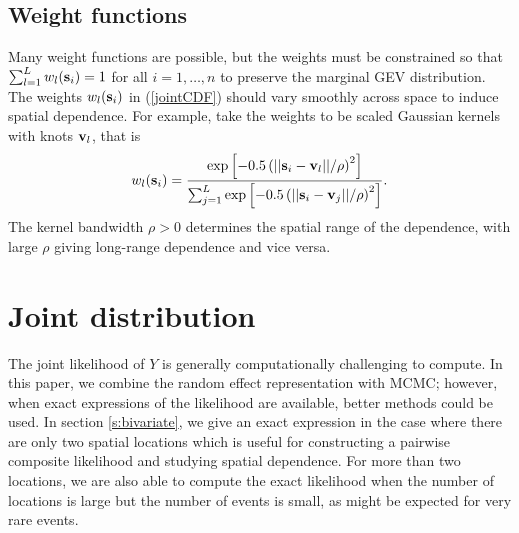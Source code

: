 \documentclass[11pt]{article}
\begin{document}
\subsection{Weight functions}\label{s:weights}
Many weight functions are possible, but the weights must be constrained so that $\sum_{l=1}^L w_{l}(\mbox{\bf s}_i)=1$ for all $i=1,\ldots,n$ to preserve the marginal GEV distribution.
The weights $w_{l}(\mbox{\bf s}_i)$ in (\ref{jointCDF}) should vary smoothly across space to induce spatial dependence.
For example, \cite{Reich2012} take the weights to be scaled Gaussian kernels with knots $\mbox{\bf v}_l$, that is
\begin{align}\label{w}
   w_{l}(\mbox{\bf s}_i) = \frac{\exp\left[-0.5\left(||\mbox{\bf s}_i-\mbox{\bf v}_l||/\rho\right)^2\right]}
                 {\sum_{j=1}^L\exp\left[-0.5\left(||\mbox{\bf s}_i-\mbox{\bf v}_j||/\rho\right)^2\right]}.
\end{align}
The kernel bandwidth $\rho>0$ determines the spatial range of the dependence, with large $\rho$ giving long-range dependence and vice versa.

\section{Joint distribution}\label{s:multivariate}
The joint likelihood of $Y$ is generally computationally challenging to compute.
In this paper, we combine the random effect representation with MCMC; however, when exact expressions of the likelihood are available, better methods could be used.
In section \ref{s:bivariate}, we give an exact expression in the case where there are only two spatial locations which is useful for constructing a pairwise composite likelihood and studying spatial dependence.
For more than two locations, we are also able to compute the exact likelihood when the number of locations is large but the number of events is small, as might be expected for very rare events.
\end{document}
